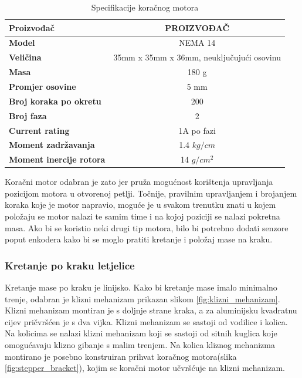 \documentclass[11pt,a4paper]{article}
\begin{document}
\begin{table}[H]
	\centering
	\caption{Specifikacije koračnog motora }
	\label{tab:specifikacija_steppera}
	\begin{tabular}{|l|c|}
		\hline
		\textbf{Proizvođač} &PROIZVOĐAČ \\ \hline 
		\textbf{Model} & NEMA 14  \\ \hline 
		\textbf{Veličina} & 35mm x 35mm x 36mm, neuključujući osovinu  \\ \hline 
		\textbf{Masa} & 180 g  \\ \hline 
		\textbf{Promjer osovine} & 5 mm \\ \hline 
		\textbf{Broj koraka po okretu} & 200 \\ \hline 
		\textbf{Broj faza} & 2 \\ \hline 
		\textbf{Current rating} & 1A po fazi \\ \hline 
		\textbf{Moment zadržavanja} & 1.4 $kg/cm$ \\ \hline 
		\textbf{Moment inercije rotora} & 14 $g/cm^2$ \\ \hline 
	\end{tabular}
\end{table}

Koračni motor odabran je zato jer pruža mogućnost korištenja upravljanja pozicijom motora u otvorenoj petlji. Točnije, pravilnim upravljanjem i brojanjem koraka koje je motor napravio, moguće je u svakom trenutku znati u kojem položaju se motor nalazi te samim time i na kojoj poziciji se nalazi pokretna masa. Ako bi se koristio neki drugi tip motora, bilo bi potrebno dodati senzore poput enkodera kako bi se moglo pratiti kretanje i položaj mase na kraku.




\subsubsection{Kretanje po kraku letjelice}

Kretanje mase po kraku je linijsko. Kako bi kretanje mase imalo minimalno trenje, odabran je klizni mehanizam prikazan slikom \ref{fig:klizni_mehanizam}. Klizni mehanizam montiran je s doljnje strane kraka, a za aluminijsku kvadratnu cijev pričvršćen je s dva vijka. Klizni mehanizam se sastoji od vodilice i kolica. Na kolicima se nalazi klizni mehanizam koji se sastoji od sitnih kuglica koje omogućavaju klizno gibanje s malim trenjem. Na kolica kliznog mehanizma montirano je posebno konstruiran prihvat koračnog motora(slika \ref{fig:stepper_bracket}), kojim se koračni motor učvršćuje na klizni mehanizam.
\end{document}
